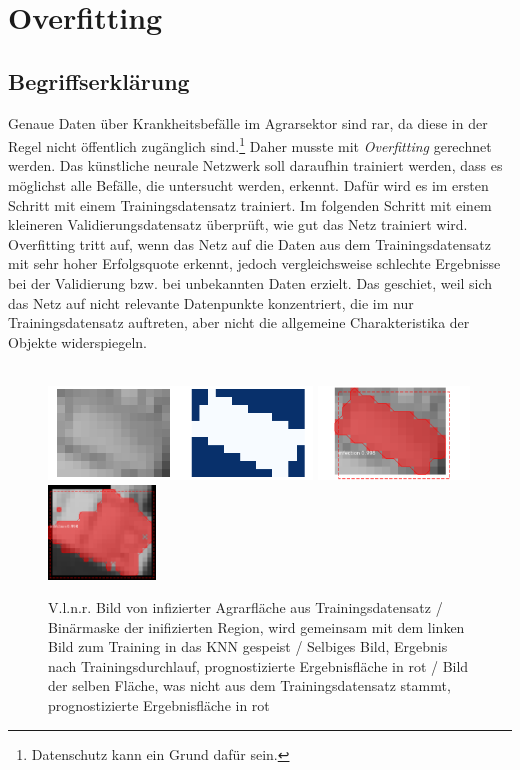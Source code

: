 \chapter{Overfitting}\label{chap:overfitting}

\section{Begriffserklärung}\label{sec:what-is-overfitting}

Genaue Daten über Krankheitsbefälle im Agrarsektor sind rar, da diese in der Regel nicht öffentlich zugänglich sind.\footnote{Datenschutz kann ein Grund dafür sein.}  Daher musste mit \textit{Overfitting} gerechnet werden. Das künstliche neurale Netzwerk soll daraufhin trainiert werden, dass es möglichst alle Befälle, die untersucht werden, erkennt. Dafür wird es im ersten Schritt mit einem Trainingsdatensatz trainiert. Im folgenden Schritt mit einem kleineren Validierungsdatensatz überprüft, wie gut das Netz trainiert wird. Overfitting tritt auf, wenn das Netz auf die Daten aus dem Trainingsdatensatz mit sehr hoher Erfolgsquote erkennt, jedoch vergleichsweise schlechte Ergebnisse bei der Validierung bzw. bei unbekannten Daten erzielt. Das geschiet, weil sich das Netz auf nicht relevante Datenpunkte konzentriert, die im nur Trainingsdatensatz auftreten, aber nicht die allgemeine Charakteristika der Objekte widerspiegeln. 
\\\\
\begin{figure}[ht]
  \centering
  \includegraphics[height=2.5cm]{pics/mask.png}
  \includegraphics[height=2.5cm]{pics/pred.png}
  \includegraphics[height=2.5cm]{pics/bad-pred.png}
  \caption[Beispiel Overfitting]{V.l.n.r. Bild von infizierter Agrarfläche aus Trainingsdatensatz / Binärmaske der inifizierten Region, wird gemeinsam mit dem linken Bild zum Training in das KNN gespeist / Selbiges Bild, Ergebnis nach Trainingsdurchlauf, prognostizierte Ergebnisfläche in rot / Bild der selben Fläche, was nicht aus dem Trainingsdatensatz stammt, prognostizierte Ergebnisfläche in rot}
  \label{fig:example-overfitting}
\end{figure}
